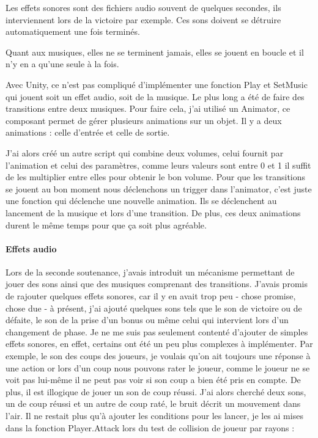 \documentclass{article}
\begin{document}
Les effets sonores sont des fichiers audio souvent de quelques secondes, ils interviennent lors de la victoire par exemple. Ces sons doivent se détruire automatiquement une fois terminés.

Quant aux musiques, elles ne se terminent jamais, elles se jouent en boucle et il n'y en a qu'une seule à la fois.

Avec Unity, ce n'est pas compliqué d'implémenter une fonction Play et SetMusic qui jouent soit un effet audio, soit de la musique. Le plus long a été de faire des transitions entre deux musiques.
Pour faire cela, j'ai utilisé un Animator, ce composant permet de gérer plusieurs animations sur un objet. Il y a deux animations : celle d'entrée et celle de sortie.

J'ai alors créé un autre script qui combine deux volumes, celui fournit par l'animation et celui des paramètres, comme leurs valeurs sont entre 0 et 1 il suffit de les multiplier entre elles pour obtenir le bon volume. Pour que les transitions se jouent au bon moment nous déclenchons un trigger dans l'animator, c'est juste une fonction qui déclenche une nouvelle animation. Ils se déclenchent au lancement de la musique et lors d'une transition. De plus, ces deux animations durent le même temps pour que ça soit plus agréable.




\newpage
\paragraph{Effets audio}


Lors de la seconde soutenance, j'avais introduit un mécanisme permettant de jouer des sons ainsi que des musiques comprenant des transitions. J'avais promis de rajouter quelques effets sonores, car il y en avait trop peu - chose promise, chose due - à présent, j'ai ajouté quelques sons tels que le son de victoire ou de défaite, le son de la prise d'un bonus ou même celui qui intervient lors d'un changement de phase. Je ne me suis pas seulement contenté d'ajouter de simples effets sonores, en effet, certains ont été un peu plus complexes à implémenter. Par exemple, le son des coups des joueurs, je voulais qu'on ait toujours une réponse à une action or lors d'un coup nous pouvons rater le joueur, comme le joueur ne se voit pas lui-même il ne peut pas voir si son coup a bien été pris en compte. De plus, il est illogique de jouer un son de coup réussi. J'ai alors cherché deux sons, un de coup réussi et un autre de coup raté, le bruit décrit un mouvement dans l'air. Il ne restait plus qu'à ajouter les conditions pour les lancer, je les ai mises dans la fonction Player.Attack lors du test de collision de joueur par rayons :
\end{document}
